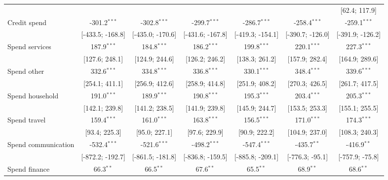 \begin{table}[htbp]
\begin{threeparttable}[b]
\begin{tabular}{lcccccc}
                                   &                  &                  &                  &                  &                  & [62.4; 117.9]\\   
         Credit spend              & -301.2$^{***}$   & -302.8$^{***}$   & -299.7$^{***}$   & -286.7$^{***}$   & -258.4$^{***}$   & -259.1$^{***}$\\   
                                   & [-433.5; -168.8] & [-435.0; -170.6] & [-431.6; -167.8] & [-419.3; -154.1] & [-390.7; -126.0] & [-391.9; -126.2]\\   
         Spend services            & 187.9$^{***}$    & 184.8$^{***}$    & 186.2$^{***}$    & 199.8$^{***}$    & 220.1$^{***}$    & 227.3$^{***}$\\   
                                   & [127.6; 248.1]   & [124.9; 244.6]   & [126.2; 246.2]   & [138.3; 261.2]   & [157.9; 282.4]   & [164.9; 289.6]\\   
         Spend other               & 332.6$^{***}$    & 334.8$^{***}$    & 336.8$^{***}$    & 330.1$^{***}$    & 348.4$^{***}$    & 339.6$^{***}$\\   
                                   & [254.1; 411.1]   & [256.9; 412.6]   & [258.9; 414.8]   & [251.9; 408.2]   & [270.3; 426.5]   & [261.7; 417.5]\\   
         Spend household           & 191.0$^{***}$    & 189.9$^{***}$    & 190.8$^{***}$    & 195.3$^{***}$    & 203.4$^{***}$    & 205.3$^{***}$\\   
                                   & [142.1; 239.8]   & [141.2; 238.5]   & [141.9; 239.8]   & [145.9; 244.7]   & [153.5; 253.3]   & [155.1; 255.5]\\   
         Spend travel              & 159.4$^{***}$    & 161.0$^{***}$    & 163.8$^{***}$    & 156.5$^{***}$    & 171.0$^{***}$    & 174.3$^{***}$\\   
                                   & [93.4; 225.3]    & [95.0; 227.1]    & [97.6; 229.9]    & [90.9; 222.2]    & [104.9; 237.0]   & [108.3; 240.3]\\   
         Spend communication       & -532.4$^{***}$   & -521.6$^{***}$   & -498.2$^{***}$   & -547.4$^{***}$   & -435.7$^{**}$    & -416.9$^{**}$\\   
                                   & [-872.2; -192.7] & [-861.5; -181.8] & [-836.8; -159.5] & [-885.8; -209.1] & [-776.3; -95.1]  & [-757.9; -75.8]\\   
         Spend finance             & 66.3$^{**}$      & 66.5$^{**}$      & 67.6$^{**}$      & 65.5$^{**}$      & 68.9$^{**}$      & 68.6$^{**}$\\   

\end{tabular}
\end{threeparttable}
\end{table}
